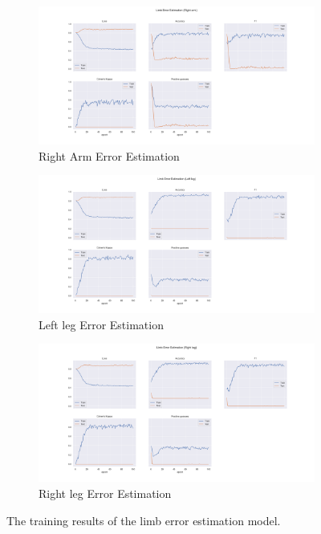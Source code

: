 \begin{figure}
  \begin{subfigure}[b]{0.9\linewidth}
      \centering
      \includegraphics[width=\textwidth]{figures/Results/lb/LimbErrorEstimation_Right arm.png}
      \caption{Right Arm Error Estimation}
      \label{fig:riar_lb_ee}
  \end{subfigure}
  \hfill
  \begin{subfigure}[b]{0.9\linewidth}
      \centering
      \includegraphics[width=\textwidth]{figures/Results/lb/LimbErrorEstimation_Left leg.png}
      \caption{Left leg Error Estimation}
      \label{fig:lele_lb_ee}
  \end{subfigure}
  \hfill
  \begin{subfigure}[b]{0.9\linewidth}
      \centering
      \includegraphics[width=\textwidth]{figures/Results/lb/LimbErrorEstimation_Right leg.png}
      \caption{Right leg Error Estimation}
      \label{fig:rileg_lb_ee}
  \end{subfigure}
  \hfill
  \caption[Limb model training results]{The training results of the limb error estimation model.}
     \label{fig:limb_training_results}
\end{figure}


